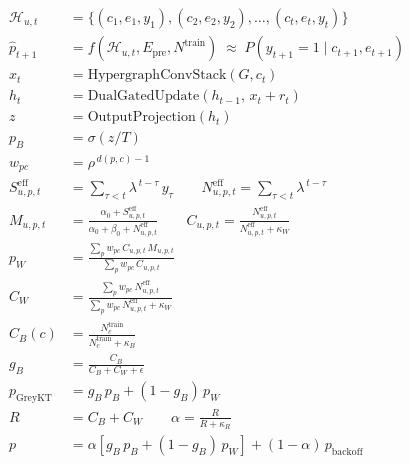\begin{align*}
\mathcal{H}_{u,t} &= \{ (c_1,e_1,y_1), (c_2,e_2,y_2), \dots, (c_t,e_t,y_t) \} \\[6pt]
\hat{p}_{t+1} &= f\!\left( \mathcal{H}_{u,t}, E_{\mathrm{pre}}, N^{\mathrm{train}} \right)
  \;\approx\; P\!\left( y_{t+1}=1 \mid c_{t+1}, e_{t+1} \right) \\[6pt]
x_t &= \mathrm{HypergraphConvStack}(G, c_t) \\
h_t &= \mathrm{DualGatedUpdate}(h_{t-1},\, x_t + r_t) \\
z   &= \mathrm{OutputProjection}(h_t) \\
p_B &= \sigma\!\left( z / T \right) \\[6pt]
w_{pc} &= \rho^{\, d(p,c) - 1} \\[6pt]
S^{\mathrm{eff}}_{u,p,t} &= \sum_{\tau < t} \lambda^{\,t-\tau} \, y_\tau
\qquad
N^{\mathrm{eff}}_{u,p,t} = \sum_{\tau < t} \lambda^{\,t-\tau} \\[6pt]
M_{u,p,t} &= \frac{\alpha_0 + S^{\mathrm{eff}}_{u,p,t}}
                  {\alpha_0 + \beta_0 + N^{\mathrm{eff}}_{u,p,t}}
\qquad
C_{u,p,t} = \frac{N^{\mathrm{eff}}_{u,p,t}}
                 {N^{\mathrm{eff}}_{u,p,t} + \kappa_W} \\[6pt]
p_W &= \frac{\sum_{p} w_{pc} \, C_{u,p,t} \, M_{u,p,t}}
            {\sum_{p} w_{pc} \, C_{u,p,t}} \\[6pt]
C_W &= \frac{\sum_{p} w_{pc} \, N^{\mathrm{eff}}_{u,p,t}}
            {\sum_{p} w_{pc} \, N^{\mathrm{eff}}_{u,p,t} + \kappa_W} \\[6pt]
C_B(c) &= \frac{N^{\mathrm{train}}_{c}}{N^{\mathrm{train}}_{c} + \kappa_B} \\[6pt]
g_B &= \frac{C_B}{C_B + C_W + \epsilon} \\[6pt]
p_{\mathrm{GreyKT}} &= g_B \, p_B + (1 - g_B) \, p_W \\[6pt]
R &= C_B + C_W \qquad \alpha = \frac{R}{R + \kappa_R} \\[6pt]
p &= \alpha \left[ g_B \, p_B + (1-g_B) \, p_W \right] + (1 - \alpha) \, p_{\mathrm{backoff}}
\end{align*}
